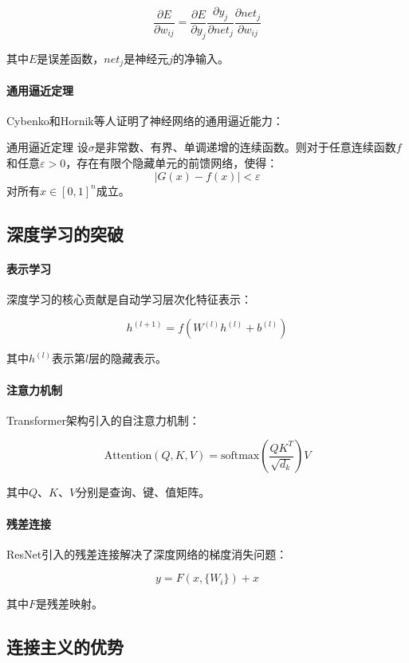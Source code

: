 $$\frac{\partial E}{\partial w_{ij}} = \frac{\partial E}{\partial y_j} \frac{\partial y_j}{\partial net_j} \frac{\partial net_j}{\partial w_{ij}}$$

其中$E$是误差函数，$net_j$是神经元$j$的净输入。

\paragraph{通用逼近定理}
Cybenko和Hornik等人证明了神经网络的通用逼近能力：

\begin{theorem}[]{通用逼近定理}
设$\sigma$是非常数、有界、单调递增的连续函数。则对于任意连续函数$f$和任意$\varepsilon > 0$，存在有限个隐藏单元的前馈网络，使得：
$$\left|G(x) - f(x)\right| < \varepsilon$$
对所有$x \in [0,1]^n$成立。
\end{theorem}

\subsection{深度学习的突破}

\paragraph{表示学习}
深度学习的核心贡献是自动学习层次化特征表示：

$$h^{(l+1)} = f\left(W^{(l)} h^{(l)} + b^{(l)}\right)$$

其中$h^{(l)}$表示第$l$层的隐藏表示。

\paragraph{注意力机制}
Transformer架构引入的自注意力机制：

$$\text{Attention}(Q, K, V) = \text{softmax}\left(\frac{QK^T}{\sqrt{d_k}}\right)V$$

其中$Q$、$K$、$V$分别是查询、键、值矩阵。

\paragraph{残差连接}
ResNet引入的残差连接解决了深度网络的梯度消失问题：

$$y = F(x, \{W_i\}) + x$$

其中$F$是残差映射。

\subsection{连接主义的优势}

